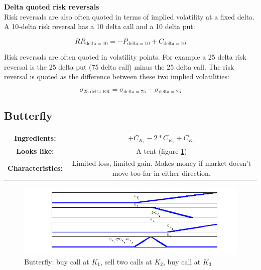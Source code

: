 \textbf{Delta quoted risk reversals}\\
Risk reversals are also often quoted in terms of implied volatility at a fixed delta. A 10-delta risk reversal has a 10 delta call and a 10 delta put:

\[RR_{\mbox{delta} = 10}= -P_{\mbox{delta}=10} + C_{\mbox{delta}=10}\]


Risk reversals are often quoted in volatility points. For example a 25 delta risk reversal is the 25 delta put (75 delta call) minus the 25 delta call. The risk reversal is quoted as the difference between these two implied volatilities:

\[ \sigma_{\mbox{25 delta RR}} = \sigma_{\mbox{delta} = 75} - \sigma_{\mbox{delta} = 25}    \]

\subsection{Butterfly}


\begin{center}
\begin{tabular}{|cc|}
\hline
\textbf{Ingredients:} &$+C_{K_1} -2*C_{K_2} + C_{K_3}$\\
\textbf{Looks like:}  &A tent (figure \ref{fig:CK1m2CK2pCK3})\\
\textbf{Characteristics:} & \parbox{3in}{Limited loss, limited gain. Makes money if market doesn't move too far in either direction.}\\
\hline
\end{tabular}
\end{center}

 \begin{figure}[ht]
\centering
  \includegraphics[width=5in] {pics/CK1m2CK2pCK3}
\caption{Butterfly: buy call at $K_1$, sell two calls at $K_2$, buy call at $K_3$}
\label{fig:CK1m2CK2pCK3}
\end{figure}

